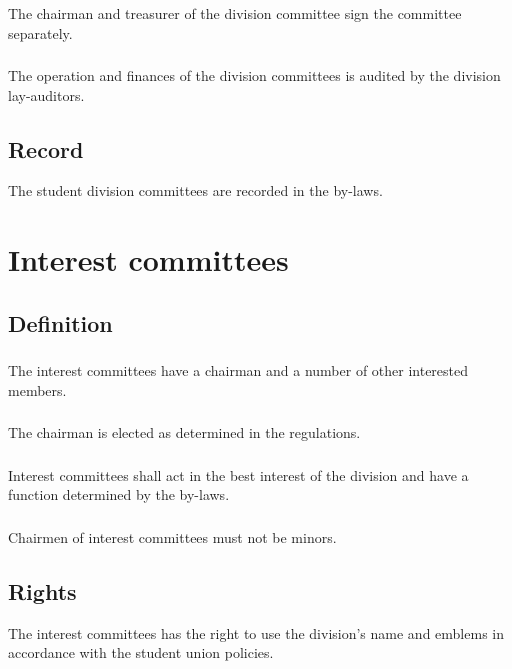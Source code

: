 \documentclass[a4paper]{dtek}
\begin{document}
\subsubsection{}
The chairman and treasurer of the division committee sign the committee separately. 



\subsubsection{}
The operation and finances of the division committees is audited by the division lay-auditors. 

\subsection{Record}
The student division committees are recorded in the by-laws.
\newpage

\section{Interest committees}
\subsection{Definition}
\subsubsection{}
The interest committees have a chairman and a number of other interested members. 

\subsubsection{}
The chairman is elected as determined in the regulations. 

\subsubsection{}
Interest committees shall act in the best interest of the division and have a function determined by the by-laws. 
\subsubsection{}
Chairmen of interest committees must not be minors.
\subsection{Rights}
The interest committees has the right to use the division's name and emblems in accordance with the student union policies.
\end{document}

